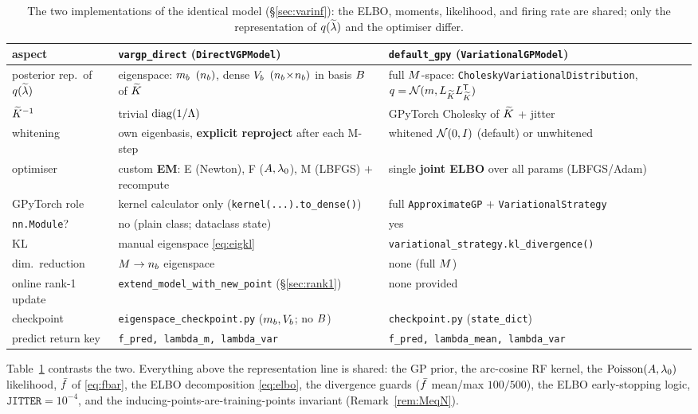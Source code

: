 \begin{table}[htbp]\centering\footnotesize
\begin{tabular}{@{}>{\raggedright\arraybackslash}p{3.0cm} >{\raggedright\arraybackslash}p{5.6cm} >{\raggedright\arraybackslash}p{5.6cm}@{}}
\toprule
aspect & \texttt{vargp\_direct} (\texttt{DirectVGPModel}) & \texttt{default\_gpy} (\texttt{VariationalGPModel}) \\
\midrule
posterior rep.\ of $q(\widetilde{\lambda})$ & eigenspace: $m_{b}$ $(n_{b})$, dense $V_{b}$ $(n_{b}\!\times\!n_{b})$ in basis $B$ of $\widetilde{K}$ & full $M$-space: \texttt{CholeskyVariational\allowbreak Distribution}, $q=\mathcal{N}(m,L_{\widetilde{K}}L_{\widetilde{K}}^{\mathsf{T}})$ \\
$\widetilde{K}^{-1}$ & trivial $\operatorname{diag}(1/\Lambda)$ & GPyTorch Cholesky of $\widetilde{K}$ + jitter \\
whitening & own eigenbasis, \textbf{explicit reproject} after each M-step & whitened $\mathcal{N}(0,I)$ (default) or unwhitened \\
optimiser & custom \textbf{EM}: E (Newton), F ($A,\lambda_{0}$), M (LBFGS) $+$ recompute & single \textbf{joint ELBO} over all params (LBFGS/Adam) \\
GPyTorch role & kernel calculator only (\texttt{kernel(...).to\_dense()}) & full \texttt{ApproximateGP} $+$ \texttt{VariationalStrategy} \\
\texttt{nn.Module}? & no (plain class; dataclass state) & yes \\
KL & manual eigenspace \eqref{eq:eigkl} & \texttt{variational\_strategy.\allowbreak kl\_divergence()} \\
dim.\ reduction & $M\to n_{b}$ eigenspace & none (full $M$) \\
online rank-1 update & \texttt{extend\_model\_with\allowbreak\_new\_point} (\S\ref{sec:rank1}) & none provided \\
checkpoint & \texttt{eigenspace\_checkpoint.py} ($m_{b},V_{b}$; no $B$) & \texttt{checkpoint.py} (\texttt{state\_dict}) \\
predict return key & \texttt{f\_pred, lambda\_m, lambda\_var} & \texttt{f\_pred, lambda\_mean, lambda\_var} \\
\bottomrule
\end{tabular}
\caption{The two implementations of the identical model
(\S\ref{sec:varinf}): the ELBO, moments, likelihood, and firing rate are shared;
only the representation of $q(\widetilde{\lambda})$ and the optimiser differ.}
\label{tab:impl-contrast}
\end{table}

Table~\ref{tab:impl-contrast} contrasts the two. Everything above the
representation line is shared: the GP prior, the arc-cosine RF kernel, the
$\mathrm{Poisson}(A,\lambda_{0})$ likelihood, $\bar{f}$ of \eqref{eq:fbar}, the ELBO
decomposition \eqref{eq:elbo}, the divergence guards ($\bar{f}$ mean/max $100/500$),
the ELBO early-stopping logic, $\texttt{JITTER}=10^{-4}$, and the
inducing-points-are-training-points invariant (Remark~\ref{rem:MeqN}).

